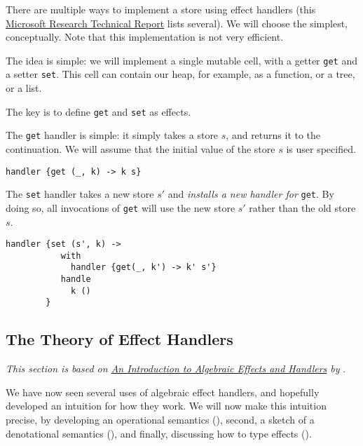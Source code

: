 There are multiple ways to implement a store using effect handlers (this \href{https://xnning.github.io/papers/effect-handlers-evidently-with-proofs.pdf}{Microsoft Research Technical Report} lists several). We will choose the simplest, conceptually. Note that this implementation is not very efficient. 

The idea is simple: we will implement a single mutable cell, with a getter \texttt{get} and a setter \texttt{set}. This cell can contain our heap, for example, as a function, or a tree, or a list. 

The key is to define \texttt{get} and \texttt{set} as effects. 

The \texttt{get} handler is simple: it simply takes a store $s$, and returns it to the continuation. We will assume that the initial value of the store $s$ is user specified.

\begin{verbatim}
handler {get (_, k) -> k s}
\end{verbatim}

The \texttt{set} handler takes a new store $s'$ and \textit{installs a new handler for} \texttt{get}. By doing so, all invocations of \texttt{get} will use the new store $s'$ rather than the old store $s$. 

\begin{verbatim}
handler {set (s', k) -> 
           with 
             handler {get(_, k') -> k' s'} 
           handle 
             k ()
        }
\end{verbatim}

\subsection{The Theory of Effect Handlers}
\textit{This section is based on \href{https://www.eff-lang.org/handlers-tutorial.pdf}{An Introduction to Algebraic Effects and Handlers} by} \citet{pretnar-2015}.

We have now seen several uses of algebraic effect handlers, and hopefully developed an intuition for how they work. We will now make this intuition precise, by developing an operational semantics (), second, a sketch of a denotational semantics (), and finally, discussing how to type effects ().

\newcommand{\keyword}[1]{\textbf{\texttt{#1}}}

